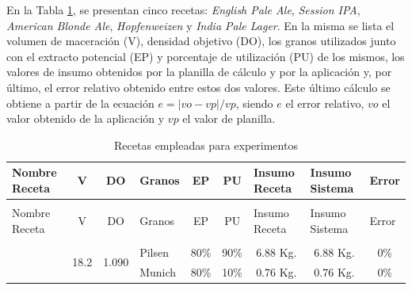 \par En la Tabla \ref{tab:TablaRecetaExperimentos}, se presentan cinco recetas: \textit{English Pale Ale}, \textit{Session IPA}, \textit{American Blonde Ale}, \textit{Hopfenweizen} y \textit{India Pale Lager}. 
En la misma se lista el volumen de maceración (V), densidad objetivo (DO), los granos utilizados junto con el extracto potencial (EP) y porcentaje de utilización (PU) de los mismos, los valores de insumo obtenidos por la planilla de cálculo y por la aplicación y, por último, el error relativo obtenido entre estos dos valores. Este último cálculo se obtiene a partir de la ecuación $ e = |vo-vp|/vp $, siendo $e$ el error relativo, $vo$ el valor obtenido de la aplicación y $vp$ el valor de planilla.

\begin{longtable}{
|p{1.8cm} %
|p{0.9cm} %
|p{0.9cm} %
|p{1.8cm} %
|p{1.0cm} %
|p{1.0cm} %
|p{1.7cm} %
|p{1.7cm} %
|p{1.0cm} %
|}
    \hline
    Nombre Receta 
    & \multicolumn{1}{c|}{V}
    & \multicolumn{1}{c|}{DO}
    & Granos
    & \multicolumn{1}{c|}{EP} 
    & \multicolumn{1}{c|}{PU} 
    & Insumo Receta
    & Insumo Sistema
    & Error \\
    \hline
    \hline
    \endfirsthead
    
    \hline
    \endfoot
    
    \hline
    \multicolumn{9}{|c|}{Continuación de la Tabla \ref{tab:TablaRecetaExperimentos}}\\
    \hline
    Nombre Receta 
    & \multicolumn{1}{c|}{V}
    & \multicolumn{1}{c|}{DO}
    & Granos 
    & \multicolumn{1}{c|}{EP} 
    & \multicolumn{1}{c|}{PU} 
    & Insumo Receta 
    & Insumo Sistema
    & Error \\
    \hline
    \hline
    \endhead
    
    \hline
    \caption{Recetas empleadas para experimentos \label{tab:TablaRecetaExperimentos}}\\
    \endlastfoot
    
    \multirow{2}{2cm}{English Pale Ale}
    &\multirow{2}{2cm}{18.2} 
    &\multirow{2}{2cm}{1.090}
    &Pilsen 
    & \multicolumn{1}{c|}{80\%}
    &\multicolumn{1}{c|}{90\%} 
    &\multicolumn{1}{c|}{6.88 Kg.} 
    &\multicolumn{1}{c|}{6.88 Kg.} 
    & \multicolumn{1}{c|}{0\%}
    \\
    &  
    &  
    & Munich
    & \multicolumn{1}{c|}{80\%}
    & \multicolumn{1}{c|}{10\%}
    &\multicolumn{1}{c|}{0.76 Kg.} &\multicolumn{1}{c|}{0.76 Kg.} 
    & \multicolumn{1}{c|}{0\%}
    \\
    \hline


\end{longtable}
